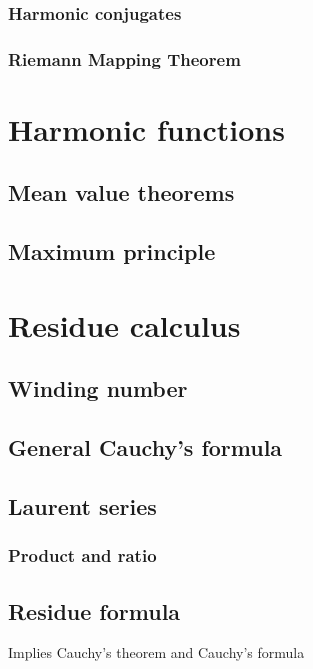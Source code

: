   \subsubsection{Harmonic conjugates}
  \subsubsection{Riemann Mapping Theorem}



\section{Harmonic functions}

\subsection{Mean value theorems}

\subsection{Maximum principle}



\section{Residue calculus}

\subsection{Winding number}

\subsection{General Cauchy's formula}

\subsection{Laurent series}

\subsubsection{Product and ratio}

\subsection{Residue formula}
  Implies Cauchy's theorem and Cauchy's formula



